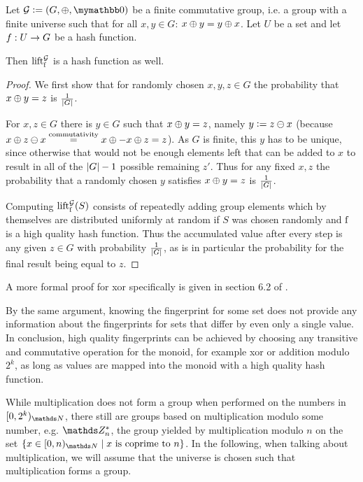 \begin{proposition}
Let $\mathcal{G} \defeq (G, \groupaddsym, \neutraladd)$ be a finite commutative group, i.e. a group with a finite universe such that for all $x, y \in G$: ${x} \oplus {y} = {y} \oplus {x}$. Let $U$ be a set and let ${f}: {U} \rightarrow {G}$ be a hash function.

Then $\operatorname{lift_{\operatorname{f}}^{\mathcal{G}}}$ is a hash function as well.

\begin{proof}
We first show that for randomly chosen $x, y, z \in G$ the probability that ${x} \oplus {y} = z$ is $\frac{1}{|{G}|}$.

For $x, z \in G$ there is $y \in G$ such that ${x} \oplus {y} = z$, namely $y \vcentcolon= {z} \ominus {x}$ (because ${x} \oplus {{z} \ominus {x}} \overset{\text{commutativity}}= {{x} \oplus {-{x}}} \oplus {z} = z$). As $G$ is finite, this $y$ has to be unique, since otherwise that would not be enough elements left that can be added to $x$ to result in all of the $|{G}| - 1$ possible remaining $z'$. Thus for any fixed $x, z$ the probability that a randomly chosen $y$ satisfies ${x} \oplus {y} = z$ is $\frac{1}{|{G}|}$.

Computing $\operatorname{lift_{\operatorname{f}}^{\mathcal{G}}}(S)$ consists of repeatedly adding group elements which by themselves are distributed uniformly at random if $S$ was chosen randomly and $\operatorname{f}$ is a high quality hash function. Thus the accumulated value after every step is any given $z \in G$ with probability $\frac{1}{|{G}|}$, as is in particular the probability for the final result being equal to $z$.
\end{proof}

A more formal proof for xor specifically is given in section 6.2 of \cite{maziarz2021hashing}.
\end{proposition}

By the same argument, knowing the fingerprint for some set does not provide any information about the fingerprints for sets that differ by even only a single value. In conclusion, high quality fingerprints can be achieved by choosing any transitive and commutative operation for the monoid, for example xor or addition modulo $2^k$, as long as values are mapped into the monoid with a high quality hash function.

While multiplication does not form a group when performed on the numbers in $\range{0}{2^k}{\N}$, there still are groups based on multiplication modulo some number, e.g. $\Z_n^\ast$, the group yielded by multiplication modulo $n$ on the set $\set{x \in \range{0}{n}{\N} \mid \text{$x$ is coprime to $n$}}$. In the following, when talking about multiplication, we will assume that the universe is chosen such that multiplication forms a group.


